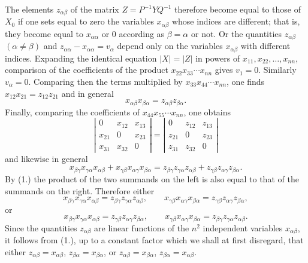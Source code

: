\documentclass[11pt]{article}
\begin{document}
The elements $z_{\alpha\beta}$ of the matrix $Z=P^{-1}YQ^{-1}$ therefore become equal to those of $X_0$ if one sets equal to zero the variables $x_{\alpha\beta}$ whose indices are different; that is, they become equal to $x_{\alpha\alpha}$ or 0 according as $\beta=\alpha$ or not. Or the quantities $z_{\alpha\beta}$ $(\alpha\ne\beta)$ and $z_{\alpha\alpha}-x_{\alpha\alpha}=v_\alpha$ depend only on the variables $x_{\alpha\beta}$ with different indices. Expanding the identical equation $|X|=|Z|$ in powers of $x_{11},x_{22},\ldots,x_{nn}$, comparison of the coefficients of the product $x_{22}x_{33}\cdots x_{nn}$ gives $v_1=0$. Similarly $v_\alpha=0$. Comparing then the terms multiplied by $x_{33}x_{44}\cdots x_{nn}$, one finds $x_{12}x_{21}=z_{12}z_{21}$ and in general
\begin{equation}\tag{1.}
x_{\alpha\beta}x_{\beta\alpha}=z_{\alpha\beta}z_{\beta\alpha}.
\end{equation}
Finally, comparing the coefficients of $x_{44}x_{55}\cdots x_{nn}$, one obtains
\[
\left|\begin{array}{ccc}
0&x_{12}&x_{13}\\
x_{21}&0&x_{23}\\
x_{31}&x_{32}&0
\end{array}\right|=
\left|\begin{array}{ccc}
0&z_{12}&z_{13}\\
z_{21}&0&z_{23}\\
z_{31}&z_{32}&0
\end{array}\right|
\]
and likewise in general
\[
x_{\beta\gamma}x_{\gamma\alpha}x_{\alpha\beta}+x_{\gamma\beta}x_{\alpha\gamma}x_{\beta\alpha}
=z_{\beta\gamma}z_{\gamma\alpha}z_{\alpha\beta}+z_{\gamma\beta}z_{\alpha\gamma}z_{\beta\alpha}.
\]
By (1.) the product of the two summands on the left is also equal to that of the summands on the right. Therefore either
\[
x_{\beta\gamma}x_{\gamma\alpha}x_{\alpha\beta}=z_{\beta\gamma}z_{\gamma\alpha}z_{\alpha\beta},
\qquad
x_{\gamma\beta}x_{\alpha\gamma}x_{\beta\alpha}=z_{\gamma\beta}z_{\alpha\gamma}z_{\beta\alpha},
\]
or
\[
x_{\beta\gamma}x_{\gamma\alpha}x_{\alpha\beta}=z_{\gamma\beta}z_{\alpha\gamma}z_{\beta\alpha},
\qquad
x_{\gamma\beta}x_{\alpha\gamma}x_{\beta\alpha}=z_{\beta\gamma}z_{\gamma\alpha}z_{\alpha\beta}.
\]
Since the quantities $z_{\alpha\beta}$ are linear functions of the $n^2$ independent variables $x_{\alpha\beta}$, it follows from (1.), up to a constant factor which we shall at first disregard, that either $z_{\alpha\beta}=x_{\alpha\beta}$, $z_{\beta\alpha}=x_{\beta\alpha}$, or $z_{\alpha\beta}=x_{\beta\alpha}$, $z_{\beta\alpha}=x_{\alpha\beta}$.
\end{document}

